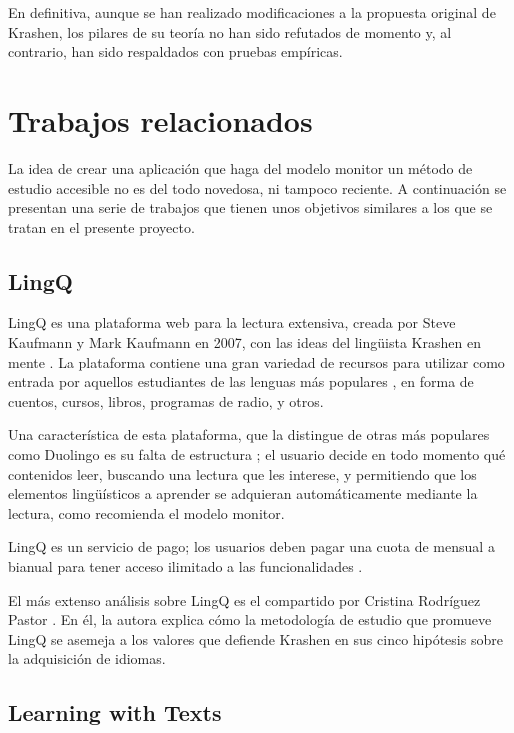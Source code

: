 En definitiva, aunque se han realizado modificaciones a la propuesta original de Krashen, los pilares de su teoría no han sido refutados de momento y, al contrario, han sido respaldados con pruebas empíricas.


\section{Trabajos relacionados}

La idea de crear una aplicación que haga del modelo monitor un método de estudio accesible no es del todo novedosa, ni tampoco reciente. A continuación se presentan una serie de trabajos que tienen unos objetivos similares a los que se tratan en el presente proyecto.

\subsection{LingQ}

LingQ es una plataforma web para la lectura extensiva, creada por Steve Kaufmann y Mark Kaufmann en 2007, con las ideas del lingüista Krashen en mente \autocite{LingQ}. La plataforma contiene una gran variedad de recursos para utilizar como entrada por aquellos estudiantes de las lenguas más populares \autocite{clara2025}, en forma de cuentos, cursos, libros, programas de radio, y otros.


Una característica de esta plataforma, que la distingue de otras más populares como Duolingo es su falta de estructura \autocite{Karasimos}; el usuario decide en todo momento qué contenidos leer, buscando una lectura que les interese, y permitiendo que los elementos lingüísticos a aprender se adquieran automáticamente mediante la lectura, como recomienda el modelo monitor.

LingQ es un servicio de pago; los usuarios deben pagar una cuota de mensual a bianual para tener acceso ilimitado a las funcionalidades \autocite{kabbasovna}.

El más extenso análisis sobre LingQ es el compartido por Cristina Rodríguez Pastor \autocite{Pastor_2022}. En él, la autora explica cómo la metodología de estudio que promueve LingQ se asemeja a los valores que defiende Krashen en sus cinco hipótesis sobre la adquisición de idiomas.

\subsection{Learning with Texts}

